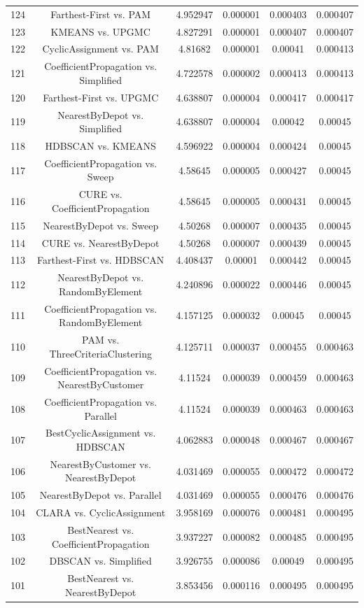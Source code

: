 \documentclass[a4paper,10pt]{article}
\begin{document}
\begin{landscape}
\begin{table}[!htp]
\begin{tabular}{cccccc}
124&Farthest-First vs. PAM&4.952947&0.000001&0.000403&0.000407\\
123&KMEANS vs. UPGMC&4.827291&0.000001&0.000407&0.000407\\
122&CyclicAssignment vs. PAM&4.81682&0.000001&0.00041&0.000413\\
121&CoefficientPropagation vs. Simplified&4.722578&0.000002&0.000413&0.000413\\
120&Farthest-First vs. UPGMC&4.638807&0.000004&0.000417&0.000417\\
119&NearestByDepot vs. Simplified&4.638807&0.000004&0.00042&0.00045\\
118&HDBSCAN vs. KMEANS&4.596922&0.000004&0.000424&0.00045\\
117&CoefficientPropagation vs. Sweep&4.58645&0.000005&0.000427&0.00045\\
116&CURE vs. CoefficientPropagation&4.58645&0.000005&0.000431&0.00045\\
115&NearestByDepot vs. Sweep&4.50268&0.000007&0.000435&0.00045\\
114&CURE vs. NearestByDepot&4.50268&0.000007&0.000439&0.00045\\
113&Farthest-First vs. HDBSCAN&4.408437&0.00001&0.000442&0.00045\\
112&NearestByDepot vs. RandomByElement&4.240896&0.000022&0.000446&0.00045\\
111&CoefficientPropagation vs. RandomByElement&4.157125&0.000032&0.00045&0.00045\\
110&PAM vs. ThreeCriteriaClustering&4.125711&0.000037&0.000455&0.000463\\
109&CoefficientPropagation vs. NearestByCustomer&4.11524&0.000039&0.000459&0.000463\\
108&CoefficientPropagation vs. Parallel&4.11524&0.000039&0.000463&0.000463\\
107&BestCyclicAssignment vs. HDBSCAN&4.062883&0.000048&0.000467&0.000467\\
106&NearestByCustomer vs. NearestByDepot&4.031469&0.000055&0.000472&0.000472\\
105&NearestByDepot vs. Parallel&4.031469&0.000055&0.000476&0.000476\\
104&CLARA vs. CyclicAssignment&3.958169&0.000076&0.000481&0.000495\\
103&BestNearest vs. CoefficientPropagation&3.937227&0.000082&0.000485&0.000495\\
102&DBSCAN vs. Simplified&3.926755&0.000086&0.00049&0.000495\\
101&BestNearest vs. NearestByDepot&3.853456&0.000116&0.000495&0.000495\\

\end{tabular}
\end{table}
\end{landscape}
\end{document}
